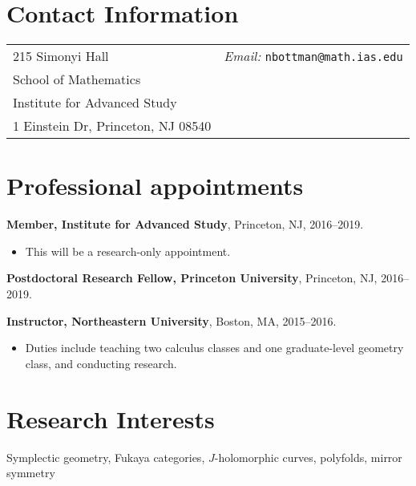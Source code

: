 \documentclass[margin,line]{res}
\begin{document}

\begin{resume}
\section{\sc Contact Information}
\vspace{.05in}
\begin{tabular}{@{}p{2.5in}p{4in}}
215 Simonyi Hall & {\it Email:} \texttt{nbottman@math.ias.edu} \\     
School of Mathematics   & \\         
Institute for Advanced Study & \\       
1 Einstein Dr, Princeton, NJ 08540 \\  
\end{tabular}

\section{\sc Professional appointments}

{\bf Member, Institute for Advanced Study}, Princeton, NJ, 2016--2019.
\begin{itemize}
\item[] This will be a research-only appointment.
\end{itemize}

{\bf Postdoctoral Research Fellow, Princeton University}, Princeton, NJ, 2016--2019.

{\bf Instructor, Northeastern University}, Boston, MA, 2015--2016. \begin{itemize}
\item[] Duties include teaching two calculus classes and one graduate-level geometry class, and conducting research.
\end{itemize}


\section{\sc Research Interests}
Symplectic geometry, Fukaya categories, \(J\)-holomorphic curves, polyfolds, mirror symmetry


\end{resume}
\end{document}
